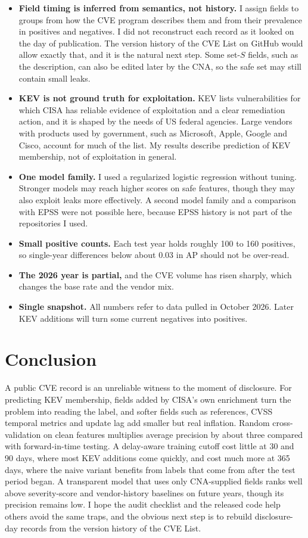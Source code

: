 \documentclass[11pt,a4paper]{article}
\begin{document}
\begin{itemize}
\item \textbf{Field timing is inferred from semantics, not history.} I assign fields to groups from how the CVE program describes them and from their prevalence in positives and negatives. I did not reconstruct each record as it looked on the day of publication. The version history of the CVE List on GitHub would allow exactly that, and it is the natural next step. Some set-$S$ fields, such as the description, can also be edited later by the CNA, so the safe set may still contain small leaks.
\item \textbf{KEV is not ground truth for exploitation.} KEV lists vulnerabilities for which CISA has reliable evidence of exploitation and a clear remediation action, and it is shaped by the needs of US federal agencies. Large vendors with products used by government, such as Microsoft, Apple, Google and Cisco, account for much of the list. My results describe prediction of KEV membership, not of exploitation in general.
\item \textbf{One model family.} I used a regularized logistic regression without tuning. Stronger models may reach higher scores on safe features, though they may also exploit leaks more effectively. A second model family and a comparison with EPSS were not possible here, because EPSS history is not part of the repositories I used.
\item \textbf{Small positive counts.} Each test year holds roughly 100 to 160 positives, so single-year differences below about 0.03 in AP should not be over-read.
\item \textbf{The 2026 year is partial,} and the CVE volume has risen sharply, which changes the base rate and the vendor mix.
\item \textbf{Single snapshot.} All numbers refer to data pulled in October 2026. Later KEV additions will turn some current negatives into positives.
\end{itemize}

\section{Conclusion}

A public CVE record is an unreliable witness to the moment of disclosure. For predicting KEV membership, fields added by CISA's own enrichment turn the problem into reading the label, and softer fields such as references, CVSS temporal metrics and update lag add smaller but real inflation. Random cross-validation on clean features multiplies average precision by about three compared with forward-in-time testing. A delay-aware training cutoff cost little at 30 and 90 days, where most KEV additions come quickly, and cost much more at 365 days, where the naive variant benefits from labels that come from after the test period began. A transparent model that uses only CNA-supplied fields ranks well above severity-score and vendor-history baselines on future years, though its precision remains low. I hope the audit checklist and the released code help others avoid the same traps, and the obvious next step is to rebuild disclosure-day records from the version history of the CVE List.
\end{document}
